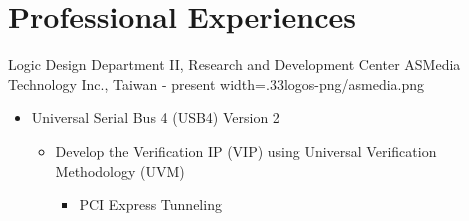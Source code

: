 \documentclass{cvclass}
\newcommand{\simplemmyy}[3]{\shortmmyyformat\formatdate{#3}{#2}{#1}}
\begin{document}
\makeinfo


\section{Professional Experiences}

    {Logic Design Department II, Research and Development Center}
    {ASMedia Technology Inc., Taiwan}
    {\simplemmyy{2023}{7}{17} - present}
    {width=.33\linewidth}{logos-png/asmedia.png}
    {\begin{itemize}
        \item Universal Serial Bus 4 (USB4\textsuperscript{\tiny\textregistered}) Version 2
        \begin{itemize}
            \item Develop the Verification IP (VIP) using Universal Verification Methodology (UVM)
            \begin{itemize}
                \item PCI Express Tunneling
            \end{itemize}
        \end{itemize}
    \end{itemize}}
\end{document}
